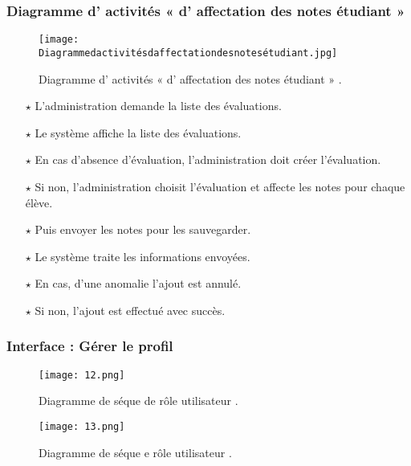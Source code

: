 \subsubsection{Diagramme d' activités « d' affectation des notes étudiant » }
\begin{figure}[ht]
	\centering
	\texttt{[image: Diagrammedactivitésdaffectationdesnotesétudiant.jpg]}
	\caption{Diagramme d' activités « d' affectation des notes étudiant » .}
	\label{fig:Diagramme d' activités  d' affectation des notes étudiant   }
\end{figure}
\FloatBarrier



	\begin{itemize}	
	
	
	
\item[$\star$] L’administration demande la liste des évaluations.
\item[$\star$] Le système affiche la liste des évaluations.
\item[$\star$] En cas d’absence d’évaluation, l’administration doit créer l’évaluation.
\item[$\star$] Si non, l’administration choisit l’évaluation et affecte les notes pour chaque élève.
\item[$\star$] Puis envoyer les notes pour les sauvegarder.
\item[$\star$] Le système traite les informations envoyées.
\item[$\star$] En cas, d’une anomalie l’ajout est annulé.
\item[$\star$] Si non, l’ajout est effectué avec succès.
	
	
	
	
\end{itemize}


\clearpage
\subsubsection{ Interface : Gérer le profil  }
\begin{figure}[ht]
	\centering
	\texttt{[image: 12.png]}
	\caption{Diagramme de séque de rôle utilisateur .}
	\label{fig:Diagramme de séon de rôle utilisateur }
\end{figure}
\FloatBarrier
\begin{figure}[ht]
	\centering
	\texttt{[image: 13.png]}
	\caption{Diagramme de séque e rôle utilisateur .}
	\label{fig:Diagramme d séo rôle utilisateur }
\end{figure}
\FloatBarrier

